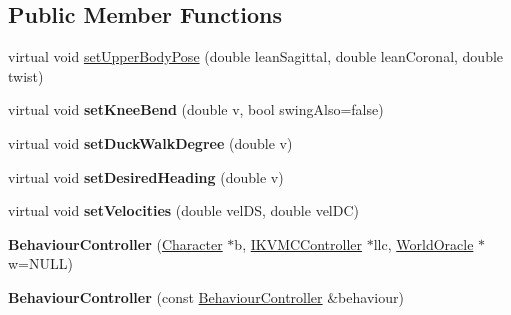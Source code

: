 \subsection*{Public Member Functions}
\begin{DoxyCompactItemize}
\item 
virtual void \hyperlink{classCartWheel_1_1Core_1_1BehaviourController_a1086038c78bc9cd190699d7756285b03}{setUpperBodyPose} (double leanSagittal, double leanCoronal, double twist)
\item 
\hypertarget{classCartWheel_1_1Core_1_1BehaviourController_acb9eec530103469280515f6768a826af}{
virtual void {\bfseries setKneeBend} (double v, bool swingAlso=false)}
\label{classCartWheel_1_1Core_1_1BehaviourController_acb9eec530103469280515f6768a826af}

\item 
\hypertarget{classCartWheel_1_1Core_1_1BehaviourController_ab07691a099652095c5c2565849217100}{
virtual void {\bfseries setDuckWalkDegree} (double v)}
\label{classCartWheel_1_1Core_1_1BehaviourController_ab07691a099652095c5c2565849217100}

\item 
\hypertarget{classCartWheel_1_1Core_1_1BehaviourController_ad366ba8e5239722c819ab3bdc3e0cb02}{
virtual void {\bfseries setDesiredHeading} (double v)}
\label{classCartWheel_1_1Core_1_1BehaviourController_ad366ba8e5239722c819ab3bdc3e0cb02}

\item 
\hypertarget{classCartWheel_1_1Core_1_1BehaviourController_a08fcd23c142e670b6b77460b7225eb72}{
virtual void {\bfseries setVelocities} (double velDS, double velDC)}
\label{classCartWheel_1_1Core_1_1BehaviourController_a08fcd23c142e670b6b77460b7225eb72}

\item 
\hypertarget{classCartWheel_1_1Core_1_1BehaviourController_aade114547d063edd76014fe2e335fb63}{
{\bfseries BehaviourController} (\hyperlink{classCartWheel_1_1Core_1_1Character}{Character} $\ast$b, \hyperlink{classCartWheel_1_1Core_1_1IKVMCController}{IKVMCController} $\ast$llc, \hyperlink{classCartWheel_1_1Core_1_1WorldOracle}{WorldOracle} $\ast$w=NULL)}
\label{classCartWheel_1_1Core_1_1BehaviourController_aade114547d063edd76014fe2e335fb63}

\item 
\hypertarget{classCartWheel_1_1Core_1_1BehaviourController_a918ef387975c58b6ed996a88138ce634}{
{\bfseries BehaviourController} (const \hyperlink{classCartWheel_1_1Core_1_1BehaviourController}{BehaviourController} \&behaviour)}
\label{classCartWheel_1_1Core_1_1BehaviourController_a918ef387975c58b6ed996a88138ce634}


\end{DoxyCompactItemize}
